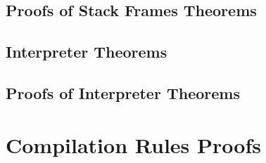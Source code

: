 \documentclass[a4paper,11pt]{report}
\begin{document}
\begin{refsection}


\section{Proofs of Stack Frames Theorems}
\label{stack-frames-proofs-appendix}



\section{Interpreter Theorems}
\label{interpreter-theorems-appendix}



\section{Proofs of Interpreter Theorems}
\label{interpreter-proofs-appendix}




\normalsize
\chapter{Compilation Rules Proofs}
\label{compilation-rules-proofs-appendix}


{\raggedright \printbibliography[resetnumbers=true, heading=bibintoc]}
\end{refsection}
\end{document}
